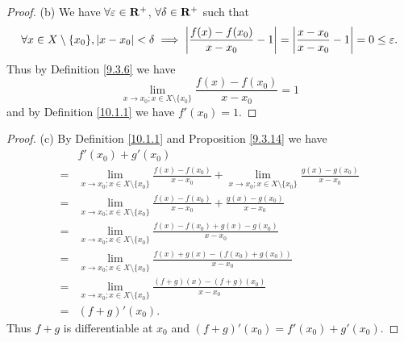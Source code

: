 \begin{proof}{(b)}
    We have \(\forall \varepsilon \in \mathbf{R}^+\), \(\forall \delta \in \mathbf{R}^+\) such that
    \[
        \forall x \in X \setminus \{x_0\}, \left\lvert x - x_0\right\rvert < \delta \implies \left\lvert\frac{f(x) - f(x_0)}{x - x_0} - 1\right\rvert = \left\lvert\frac{x - x_0}{x - x_0} - 1\right\rvert = 0 \leq \varepsilon.
    \]
    Thus by Definition \ref{9.3.6} we have
    \[
        \lim_{x \to x_0 ; x \in X \setminus \{x_0\}} \frac{f(x) - f(x_0)}{x - x_0} = 1
    \]
    and by Definition \ref{10.1.1} we have \(f'(x_0) = 1\).
\end{proof}

\begin{proof}{(c)}
    By Definition \ref{10.1.1} and Proposition \ref{9.3.14} we have
    \begin{align*}
          & f'(x_0) + g'(x_0)                                                                                                                                       \\
        = & \lim_{x \to x_0 ; x \in X \setminus \{x_0\}} \frac{f(x) - f(x_0)}{x - x_0} + \lim_{x \to x_0 ; x \in X \setminus \{x_0\}} \frac{g(x) - g(x_0)}{x - x_0} \\
        = & \lim_{x \to x_0 ; x \in X \setminus \{x_0\}} \frac{f(x) - f(x_0)}{x - x_0} + \frac{g(x) - g(x_0)}{x - x_0}                                              \\
        = & \lim_{x \to x_0 ; x \in X \setminus \{x_0\}} \frac{f(x) - f(x_0) + g(x) - g(x_0)}{x - x_0}                                                              \\
        = & \lim_{x \to x_0 ; x \in X \setminus \{x_0\}} \frac{f(x) + g(x) - (f(x_0) + g(x_0))}{x - x_0}                                                            \\
        = & \lim_{x \to x_0 ; x \in X \setminus \{x_0\}} \frac{(f + g)(x) - (f + g)(x_0)}{x - x_0}                                                                  \\
        = & (f + g)'(x_0).
    \end{align*}
    Thus \(f + g\) is differentiable at \(x_0\) and \((f + g)'(x_0) = f'(x_0) + g'(x_0)\).
\end{proof}

